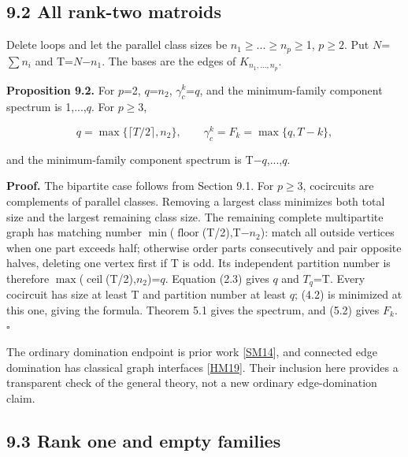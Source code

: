 \documentclass[11pt]{article}
\begin{document}
\subsection*{9.2 All rank-two matroids}

Delete loops and let the parallel class sizes be \(n_1\)\(\ge\)...\(\ge\)\(n_p\)\(\ge\)1, \(p\ge2\). Put \(N\)=\(\sum n_i\) and T=\(N\)\ensuremath{-}\(n_1\). The bases are the edges of \(K_{n_1,\ldots,n_p}\).

\textbf{Proposition 9.2.} For \(p\)=2, \(q\)=\(n_2\), \(\gamma_c^k\)=\(q\), and the minimum-family component spectrum is 1,...,\(q\). For \(p\ge3\),

\[
q=\max\{\lceil T/2\rceil,n_2\},\qquad
\gamma_c^k=F_k=\max\{q,T-k\},
\]

and the minimum-family component spectrum is T\ensuremath{-}\(q\),...,\(q\).

\textbf{Proof.} The bipartite case follows from Section 9.1. For \(p\ge3\), cocircuits are complements of parallel classes. Removing a largest class minimizes both total size and the largest remaining class size. The remaining complete multipartite graph has matching number \(\min\)(\(\operatorname{floor}\)(T/2),T\ensuremath{-}\(n_2\)): match all outside vertices when one part exceeds half; otherwise order parts consecutively and pair opposite halves, deleting one vertex first if T is odd. Its independent partition number is therefore \(\max\)(\(\operatorname{ceil}\)(T/2),\(n_2\))=\(q\). Equation (2.3) gives \(q\) and \(T_q\)=T. Every cocircuit has size at least T and partition number at least \(q\); (4.2) is minimized at this one, giving the formula. Theorem 5.1 gives the spectrum, and (5.2) gives \(F_k\). \hfill\ensuremath{\square}

The ordinary domination endpoint is prior work [\hyperlink{refSM14}{SM14}], and connected edge domination has classical graph interfaces [\hyperlink{refHM19}{HM19}]. Their inclusion here provides a transparent check of the general theory, not a new ordinary edge-domination claim.

\subsection*{9.3 Rank one and empty families}
\end{document}

